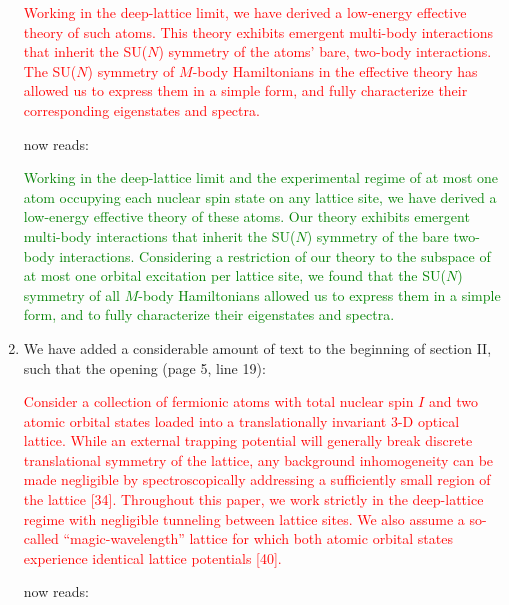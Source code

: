 \documentclass[preprint]{revtex4-1}
\newcommand{\1}{\mathds{1}}
\newcommand{\red}[1]{\textcolor{red}{#1}}
\newcommand{\green}[1]{\textcolor{green}{#1}}
\newcounter{point}
\begin{document}
\begin{enumerate}[label=(R1.\arabic{point}.\arabic*)]
  \red{Working in the deep-lattice limit, we have derived a low-energy
    effective theory of such atoms.  This theory exhibits emergent
    multi-body interactions that inherit the SU($N$) symmetry of the
    atoms' bare, two-body interactions.  The SU($N$) symmetry of
    $M$-body Hamiltonians in the effective theory has allowed us to
    express them in a simple form, and fully characterize their
    corresponding eigenstates and spectra.}

  now reads:

  \green{Working in the deep-lattice limit and the experimental regime
    of at most one atom occupying each nuclear spin state on any
    lattice site, we have derived a low-energy effective theory of
    these atoms.  Our theory exhibits emergent multi-body interactions
    that inherit the SU($N$) symmetry of the bare two-body
    interactions.  Considering a restriction of our theory to the
    subspace of at most one orbital excitation per lattice site, we
    found that the SU($N$) symmetry of all $M$-body Hamiltonians
    allowed us to express them in a simple form, and to fully
    characterize their eigenstates and spectra.}

\item We have added a considerable amount of text to the beginning of
  section II, such that the opening (page 5, line 19):

  \red{Consider a collection of fermionic atoms with total nuclear
    spin $I$ and two atomic orbital states loaded into a
    translationally invariant 3-D optical lattice.  While an external
    trapping potential will generally break discrete translational
    symmetry of the lattice, any background inhomogeneity can be made
    negligible by spectroscopically addressing a sufficiently small
    region of the lattice [34].  Throughout this paper, we work
    strictly in the deep-lattice regime with negligible tunneling
    between lattice sites.  We also assume a so-called
    ``magic-wavelength'' lattice for which both atomic orbital states
    experience identical lattice potentials [40].}

  now reads:


\end{enumerate}
\end{document}
